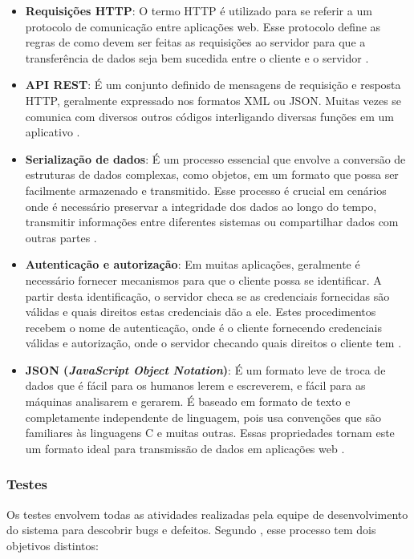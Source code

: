 \begin{itemize}
    \item \textbf{Requisições HTTP}: O termo HTTP é utilizado para se referir a um protocolo de comunicação entre aplicações web. Esse protocolo define as regras de como devem ser feitas as requisições ao servidor para que a transferência de dados seja bem sucedida entre o cliente e o servidor \cite{portilho2021desenvolvimento}.
    \item \textbf{API REST}: É um conjunto definido de mensagens de requisição e resposta HTTP, geralmente expressado nos formatos XML ou JSON. Muitas vezes se comunica com diversos outros códigos interligando diversas funções em um aplicativo \cite{oliveira2014desenvolvimento}.
    \item \textbf{Serialização de dados}: É um processo essencial que envolve a conversão de estruturas de dados complexas, como objetos, em um formato que possa ser facilmente armazenado e transmitido. Esse processo é crucial em cenários onde é necessário preservar a integridade dos dados ao longo do tempo, transmitir informações entre diferentes sistemas ou compartilhar dados com outras partes \cite{castilhos2024analise}.
    \item \textbf{Autenticação e autorização}: Em muitas aplicações, geralmente é necessário fornecer mecanismos para que o cliente possa se identificar. A partir desta identificação, o servidor checa se as credenciais fornecidas são válidas e quais direitos estas credenciais dão a ele. Estes procedimentos recebem o nome de autenticação, onde é o cliente fornecendo credenciais válidas e autorização, onde o servidor checando quais direitos o cliente tem \cite{oliveira2014desenvolvimento}.
    \item \textbf{JSON (\textit{JavaScript Object Notation})}: É um formato leve de troca de dados que é fácil para os humanos lerem e escreverem, e fácil para as máquinas analisarem e gerarem. É baseado em formato de texto e completamente independente de linguagem, pois usa convenções que são familiares às linguagens C e muitas outras. Essas propriedades tornam este um formato ideal para transmissão de dados em aplicações web \cite{json2025}.
\end{itemize}

\subsubsection{Testes}

Os testes envolvem todas as atividades realizadas pela equipe de desenvolvimento do sistema para descobrir bugs e defeitos. Segundo , esse processo tem dois objetivos distintos:


